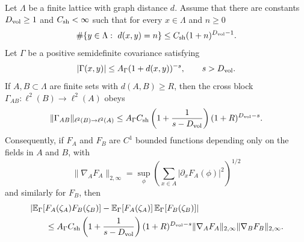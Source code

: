 \begin{lemma}
\label{lem:summable-covariance-tail-bridge-estimate}
Let \(\Lambda\) be a finite lattice with graph distance \(d\).  Assume that
there are constants \(D_{\rm vol}\geq1\) and \(C_{\rm sh}<\infty\) such that
for every \(x\in\Lambda\) and \(n\geq0\)
\begin{equation}
  \#\{y\in\Lambda:\ d(x,y)=n\}
  \leq
  C_{\rm sh}(1+n)^{D_{\rm vol}-1}.
  \label{eq:rg-shell-count-bound}
\end{equation}
Let \(\Gamma\) be a positive semidefinite covariance satisfying
\begin{equation}
  |\Gamma(x,y)|
  \leq
  A_\Gamma(1+d(x,y))^{-s},
  \qquad s>D_{\rm vol}.
  \label{eq:rg-covariance-polynomial-tail-bound}
\end{equation}
If \(A,B\subset\Lambda\) are finite sets with \(d(A,B)\geq R\), then the
cross block \(\Gamma_{AB}:\ell^2(B)\to\ell^2(A)\) obeys
\begin{equation}
  \|\Gamma_{AB}\|_{\ell^2(B)\to\ell^2(A)}
  \leq
  A_\Gamma C_{\rm sh}
  \left(1+\frac{1}{s-D_{\rm vol}}\right)
  (1+R)^{D_{\rm vol}-s}.
  \label{eq:rg-covariance-tail-schur-bound}
\end{equation}
Consequently, if \(F_A\) and \(F_B\) are \(C^1\) bounded functions depending
only on the fields in \(A\) and \(B\), with
\[
  \|\nabla_A F_A\|_{2,\infty}
  =
  \sup_\phi
  \left(\sum_{x\in A}|\partial_xF_A(\phi)|^2\right)^{1/2}
\]
and similarly for \(F_B\), then
\begin{equation}
\begin{aligned}
  &\left|
    \mathbb E_\Gamma[F_A(\zeta_A)F_B(\zeta_B)]
    -
    \mathbb E_\Gamma[F_A(\zeta_A)]\,
    \mathbb E_\Gamma[F_B(\zeta_B)]
  \right|                                                    \\
  &\qquad\leq
  A_\Gamma C_{\rm sh}
  \left(1+\frac{1}{s-D_{\rm vol}}\right)
  (1+R)^{D_{\rm vol}-s}
  \|\nabla_AF_A\|_{2,\infty}\|\nabla_BF_B\|_{2,\infty}.
\end{aligned}
  \label{eq:rg-covariance-tail-connected-bound}
\end{equation}
\end{lemma}

